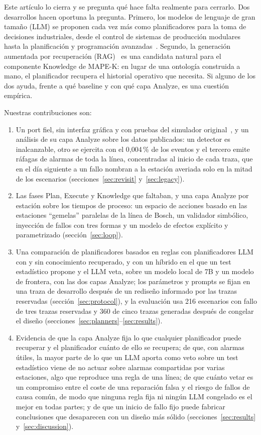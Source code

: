 \documentclass[preprint,11pt]{elsarticle}
\begin{document}
Este artículo lo cierra y se pregunta qué hace falta realmente para cerrarlo. Dos desarrollos hacen oportuna la pregunta. Primero, los modelos de lenguaje de gran tamaño (LLM) se proponen cada vez más como planificadores para la toma de decisiones industriales, desde el control de sistemas de producción modulares~\cite{xia2023towards} hasta la planificación y programación avanzadas~\cite{li2026a4ps}. Segundo, la generación aumentada por recuperación (RAG)~\cite{lewis2020rag} es una candidata natural para el componente Knowledge de MAPE-K: en lugar de una ontología construida a mano, el planificador recupera el historial operativo que necesita. Si alguno de los dos ayuda, frente a qué baseline y con qué capa Analyze, es una cuestión empírica.

Nuestras contribuciones son:
\begin{enumerate}
  \item Un port fiel, sin interfaz gráfica y con pruebas del simulador original~\cite{sanchez2020selfstar}, y un análisis de su capa Analyze sobre los datos publicados: un detector es inalcanzable, otro se ejercita con el 0{,}004\,\% de los eventos y el tercero emite ráfagas de alarmas de toda la línea, concentradas al inicio de cada traza, que en el día siguiente a un fallo nombran a la estación averiada solo en la mitad de los escenarios (secciones~\ref{sec:revisit} y~\ref{sec:legacy}).
  \item Las fases Plan, Execute y Knowledge que faltaban, y una capa Analyze por estación sobre los tiempos de proceso: un espacio de acciones basado en las estaciones ``gemelas'' paralelas de la línea de Bosch, un validador simbólico, inyección de fallos con tres formas y un modelo de efectos explícito y parametrizado (sección~\ref{sec:loop}).
  \item Una comparación de planificadores basados en reglas con planificadores LLM con y sin conocimiento recuperado, y con un híbrido en el que un test estadístico propone y el LLM veta, sobre un modelo local de 7B y un modelo de frontera, con las dos capas Analyze; los parámetros y prompts se fijan en una traza de desarrollo después de un rediseño informado por las trazas reservadas (sección~\ref{sec:protocol}), y la evaluación usa 216 escenarios con fallo de tres trazas reservadas y 360 de cinco trazas generadas después de congelar el diseño (secciones~\ref{sec:planners}--\ref{sec:results}).
  \item Evidencia de que la capa Analyze fija lo que cualquier planificador puede recuperar y el planificador cuánto de ello se recupera; de que, con alarmas útiles, la mayor parte de lo que un LLM aporta como veto sobre un test estadístico viene de no actuar sobre alarmas compartidas por varias estaciones, algo que reproduce una regla de una línea; de que cuánto vetar es un compromiso entre el coste de una reparación falsa y el riesgo de fallos de causa común, de modo que ninguna regla fija ni ningún LLM congelado es el mejor en todas partes; y de que un inicio de fallo fijo puede fabricar conclusiones que desaparecen con un diseño más sólido (secciones~\ref{sec:results} y~\ref{sec:discussion}).
\end{enumerate}
\end{document}
